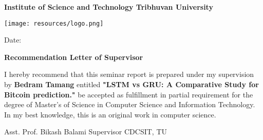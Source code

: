 \begin{center}
	\textbf{
		\large
		Institute of Science and Technology
		\linebreak
		Tribhuvan University
	}
\end{center}

\vspace{2cm}

\begin{center}
	\texttt{[image: resources/logo.png]}
\end{center}

\begin{flushright}
	Date: \dottedline{4cm}
\end{flushright}

\vspace{2cm}

\begin{center}
	\textbf{Recommendation Letter of Supervisor}
\end{center}

\vspace{1cm}

I hereby recommend that this seminar report is prepared under my supervision by \textbf{Bedram Tamang} entitled \textbf{"LSTM vs GRU: A Comparative Study for Bitcoin prediction."} be accepted as fulfillment in partial requirement for the degree of Master's of Science in Computer Science and Information Technology. In my best knowledge, this is an original work in computer science.

\vspace{3cm}

\begin{flushleft}
	\dottedline{5.8cm} \newline
	Asst. Prof. Bikash Balami \newline
	Supervisor \newline
	CDCSIT, TU \newline
\end{flushleft}

\clearpage